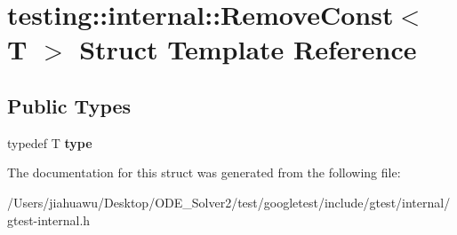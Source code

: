 \hypertarget{structtesting_1_1internal_1_1_remove_const}{}\section{testing\+:\+:internal\+:\+:Remove\+Const$<$ T $>$ Struct Template Reference}
\label{structtesting_1_1internal_1_1_remove_const}
\subsection*{Public Types}
\begin{DoxyCompactItemize}
\item 
\mbox{\label{structtesting_1_1internal_1_1_remove_const_a1be32027ea4edcc0d15abd59aba4a97f}} 
typedef T {\bfseries type}
\end{DoxyCompactItemize}


The documentation for this struct was generated from the following file\+:\begin{DoxyCompactItemize}
\item 
/\+Users/jiahuawu/\+Desktop/\+O\+D\+E\+\_\+\+Solver2/test/googletest/include/gtest/internal/gtest-\/internal.\+h\end{DoxyCompactItemize}
